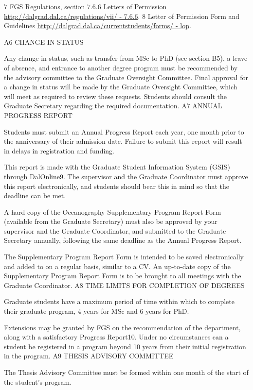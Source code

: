 \documentclass{article}
\newcommand\elink[1]{\url{#1}}
\begin{document}
7 FGS Regulations, section 7.6.6 Letters of Permission \elink{http://dalgrad.dal.ca/regulations/vii/ - 7.6.6}.
8 Letter of Permission Form and Guidelines \elink{http://dalgrad.dal.ca/currentstudents/forms/ - lop}.
 

A6	CHANGE IN STATUS

Any change in status, such as transfer from MSc to PhD (see section B5), a leave of absence, and entrance to another degree program must be recommended by the advisory committee to the Graduate Oversight Committee. Final approval for a change in status will be made by the Graduate Oversight Committee, which will meet as required to review these requests. Students should consult the Graduate Secretary regarding the required documentation.
A7	ANNUAL PROGRESS REPORT

Students must submit an Annual Progress Report each year, one month prior to the anniversary of their admission date. Failure to submit this report will result in delays in registration and funding.

This report is made with the Graduate Student Information System (GSIS) through DalOnline9. The supervisor and the Graduate Coordinator must approve this report electronically, and students should bear this in mind so that the deadline can be met.

A hard copy of the Oceanography Supplementary Program Report Form (available from the Graduate Secretary) must also be approved by your supervisor and the Graduate Coordinator, and submitted to the Graduate Secretary annually, following the same deadline as the Annual Progress Report.

The Supplementary Program Report Form is intended to be saved electronically and added to on a regular basis, similar to a CV. An up-to-date copy of the Supplementary Program Report Form is to be brought to all meetings with the Graduate Coordinator.
A8	TIME LIMITS FOR COMPLETION OF DEGREES

Graduate students have a maximum period of time within which to complete their graduate program, 4 years for MSc and 6 years for PhD.

Extensions may be granted by FGS on the recommendation of the department, along with a satisfactory Progress Report10. Under no circumstances can a student be registered in a program beyond 10 years from their initial registration in the program.
A9	THESIS ADVISORY COMMITTEE

The Thesis Advisory Committee must be formed within one month of the start of the student’s program.
\end{document}
